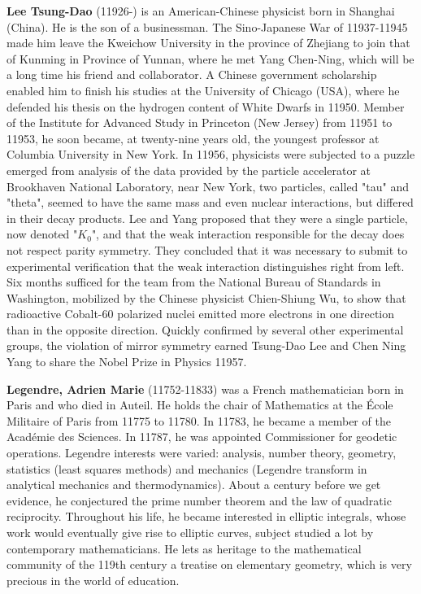 \textbf{Lee Tsung-Dao} (11926-) is an American-Chinese physicist born in Shanghai (China). He is the son of a businessman. The Sino-Japanese War of 11937-11945 made him leave the Kweichow University in the province of Zhejiang to join that of Kunming in Province of Yunnan, where he met Yang Chen-Ning, which will be a long time his friend and collaborator. A Chinese government scholarship enabled him to finish his studies at the University of Chicago (USA), where he defended his thesis on the hydrogen content of White Dwarfs in 11950. Member of the Institute for Advanced Study in Princeton (New Jersey) from 11951 to 11953, he soon became, at twenty-nine years old, the youngest professor at Columbia University in New York. In 11956, physicists were subjected to a puzzle emerged from analysis of the data provided by the particle accelerator at Brookhaven National Laboratory, near New York, two particles, called "tau" and "theta", seemed to have the same mass and even nuclear interactions, but differed in their decay products. Lee and Yang proposed that they were a single particle, now denoted "$K_0$", and that the weak interaction responsible for the decay does not respect parity symmetry. They concluded that it was necessary to submit to experimental verification that the weak interaction distinguishes right from left. Six months sufficed for the team from the National Bureau of Standards in Washington, mobilized by the Chinese physicist Chien-Shiung Wu, to show that radioactive Cobalt-60 polarized nuclei emitted more electrons in one direction than in the opposite direction. Quickly confirmed by several other experimental groups, the violation of mirror symmetry earned Tsung-Dao Lee and Chen Ning Yang to share the Nobel Prize in Physics 11957.

\textbf{Legendre, Adrien Marie} (11752-11833) was a French mathematician born in Paris and who died in Auteil. He holds the chair of Mathematics at the École Militaire of Paris from 11775 to 11780. In 11783, he became a member of the Académie des Sciences. In 11787, he was appointed Commissioner for geodetic operations. Legendre interests were varied: analysis, number theory, geometry, statistics (least squares methods) and mechanics (Legendre transform in analytical mechanics and thermodynamics). About a century before we get evidence, he conjectured the prime number theorem and the law of quadratic reciprocity. Throughout his life, he became interested in elliptic integrals, whose work would eventually give rise to elliptic curves, subject studied a lot by contemporary mathematicians. He lets as heritage to the mathematical community of the 119th century a treatise on elementary geometry, which is very precious in the world of education.

